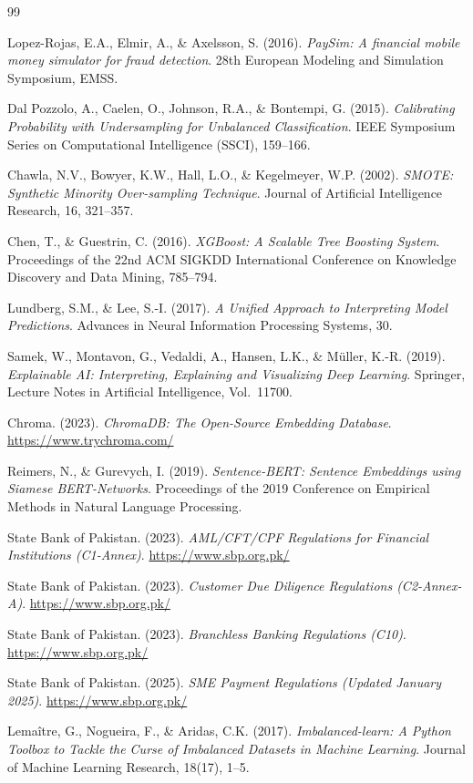 \documentclass[12pt,a4paper]{article}
\begin{document}
\begin{thebibliography}{99}

Lopez-Rojas, E.A., Elmir, A., \& Axelsson, S. (2016).
\textit{PaySim: A financial mobile money simulator for fraud detection}.
28th European Modeling and Simulation Symposium, EMSS.

Dal Pozzolo, A., Caelen, O., Johnson, R.A., \& Bontempi, G. (2015).
\textit{Calibrating Probability with Undersampling for Unbalanced Classification}.
IEEE Symposium Series on Computational Intelligence (SSCI), 159--166.

Chawla, N.V., Bowyer, K.W., Hall, L.O., \& Kegelmeyer, W.P. (2002).
\textit{SMOTE: Synthetic Minority Over-sampling Technique}.
Journal of Artificial Intelligence Research, 16, 321--357.

Chen, T., \& Guestrin, C. (2016).
\textit{XGBoost: A Scalable Tree Boosting System}.
Proceedings of the 22nd ACM SIGKDD International Conference on Knowledge Discovery and Data Mining, 785--794.

Lundberg, S.M., \& Lee, S.-I. (2017).
\textit{A Unified Approach to Interpreting Model Predictions}.
Advances in Neural Information Processing Systems, 30.

Samek, W., Montavon, G., Vedaldi, A., Hansen, L.K., \& M\"{u}ller, K.-R. (2019).
\textit{Explainable AI: Interpreting, Explaining and Visualizing Deep Learning}.
Springer, Lecture Notes in Artificial Intelligence, Vol.\ 11700.

Chroma. (2023).
\textit{ChromaDB: The Open-Source Embedding Database}.
\url{https://www.trychroma.com/}

Reimers, N., \& Gurevych, I. (2019).
\textit{Sentence-BERT: Sentence Embeddings using Siamese BERT-Networks}.
Proceedings of the 2019 Conference on Empirical Methods in Natural Language Processing.

State Bank of Pakistan. (2023).
\textit{AML/CFT/CPF Regulations for Financial Institutions (C1-Annex)}.
\url{https://www.sbp.org.pk/}

State Bank of Pakistan. (2023).
\textit{Customer Due Diligence Regulations (C2-Annex-A)}.
\url{https://www.sbp.org.pk/}

State Bank of Pakistan. (2023).
\textit{Branchless Banking Regulations (C10)}.
\url{https://www.sbp.org.pk/}

State Bank of Pakistan. (2025).
\textit{SME Payment Regulations (Updated January 2025)}.
\url{https://www.sbp.org.pk/}

Lema\^{i}tre, G., Nogueira, F., \& Aridas, C.K. (2017).
\textit{Imbalanced-learn: A Python Toolbox to Tackle the Curse of Imbalanced Datasets in Machine Learning}.
Journal of Machine Learning Research, 18(17), 1--5.

\end{thebibliography}
\end{document}
